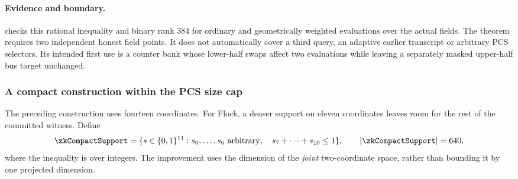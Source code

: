 \paragraph{Evidence and boundary.}  checks this rational inequality and binary rank $384$ for ordinary and geometrically weighted evaluations over the actual fields. The theorem requires two independent honest field points. It does not automatically cover a third query, an adaptive earlier transcript or arbitrary PCS selectors. Its intended first use is a counter bank whose lower-half swaps affect two evaluations while leaving a separately masked upper-half bus target unchanged.

\subsubsection{A compact construction within the PCS size cap}\label{sec:zk-compact-two-point}

The preceding construction uses fourteen coordinates. For Flock, a denser support on eleven coordinates leaves room for the rest of the committed witness. Define
\[
 \zkCompactSupport=\{s\in\cube{11}:s_0,\ldots,s_6\text{ arbitrary},\quad s_7+\cdots+s_{10}\le1\},
 \qquad |\zkCompactSupport|=640,
\]
where the inequality is over integers. The improvement uses the dimension of the \emph{joint} two-coordinate space, rather than bounding it by one projected dimension.

